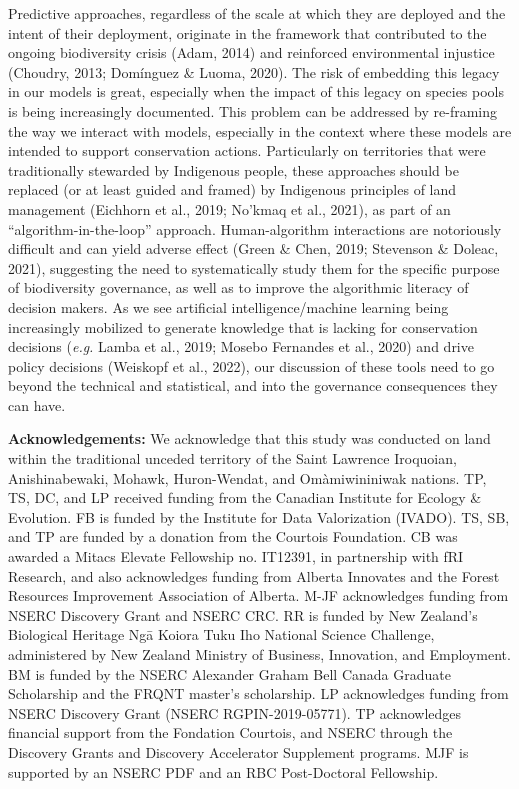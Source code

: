\documentclass[10pt,oneside]{article}
\begin{document}
Predictive approaches, regardless of the scale at which they are
deployed and the intent of their deployment, originate in the framework
that contributed to the ongoing biodiversity crisis (Adam, 2014) and
reinforced environmental injustice (Choudry, 2013; Domínguez \& Luoma,
2020). The risk of embedding this legacy in our models is great,
especially when the impact of this legacy on species pools is being
increasingly documented. This problem can be addressed by re-framing the
way we interact with models, especially in the context where these
models are intended to support conservation actions. Particularly on
territories that were traditionally stewarded by Indigenous people,
these approaches should be replaced (or at least guided and framed) by
Indigenous principles of land management (Eichhorn et al., 2019; No'kmaq
et al., 2021), as part of an ``algorithm-in-the-loop'' approach.
Human-algorithm interactions are notoriously difficult and can yield
adverse effect (Green \& Chen, 2019; Stevenson \& Doleac, 2021),
suggesting the need to systematically study them for the specific
purpose of biodiversity governance, as well as to improve the
algorithmic literacy of decision makers. As we see artificial
intelligence/machine learning being increasingly mobilized to generate
knowledge that is lacking for conservation decisions (\emph{e.g.} Lamba
et al., 2019; Mosebo Fernandes et al., 2020) and drive policy decisions
(Weiskopf et al., 2022), our discussion of these tools need to go beyond
the technical and statistical, and into the governance consequences they
can have.

\textbf{Acknowledgements:} We acknowledge that this study was conducted
on land within the traditional unceded territory of the Saint Lawrence
Iroquoian, Anishinabewaki, Mohawk, Huron-Wendat, and Omàmiwininiwak
nations. TP, TS, DC, and LP received funding from the Canadian Institute
for Ecology \& Evolution. FB is funded by the Institute for Data
Valorization (IVADO). TS, SB, and TP are funded by a donation from the
Courtois Foundation. CB was awarded a Mitacs Elevate Fellowship no.
IT12391, in partnership with fRI Research, and also acknowledges funding
from Alberta Innovates and the Forest Resources Improvement Association
of Alberta. M-JF acknowledges funding from NSERC Discovery Grant and
NSERC CRC. RR is funded by New Zealand's Biological Heritage Ngā Koiora
Tuku Iho National Science Challenge, administered by New Zealand
Ministry of Business, Innovation, and Employment. BM is funded by the
NSERC Alexander Graham Bell Canada Graduate Scholarship and the FRQNT
master's scholarship. LP acknowledges funding from NSERC Discovery Grant
(NSERC RGPIN-2019-05771). TP acknowledges financial support from the
Fondation Courtois, and NSERC through the Discovery Grants and Discovery
Accelerator Supplement programs. MJF is supported by an NSERC PDF and an
RBC Post-Doctoral Fellowship.
\end{document}
